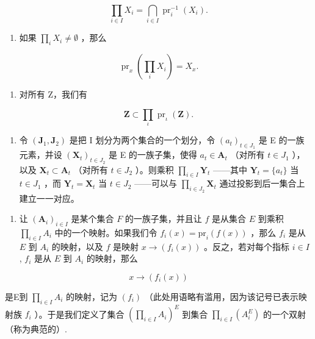 \[
\prod_ {i \in I} X _ {i} = \bigcap_ {i \in I} \operatorname{pr}_{i}^{-1}(X _ {i}).\tag{47}
\]

\begin{enumerate}
\def\labelenumi{(\alph{enumi})}
\setcounter{enumi}{2}
\tightlist
\item
  如果 \(\prod_{i} X_i \neq \emptyset\) ，那么
\end{enumerate}

\[
\operatorname{pr} _ {x} \left(\prod_ {i} X _ {i}\right) = X _ {x}.\tag{48}
\]

\begin{enumerate}
\def\labelenumi{(\alph{enumi})}
\setcounter{enumi}{3}
\tightlist
\item
  对所有 Z，我们有
\end{enumerate}

\[
\mathbf {Z} \subset \prod_ {\iota} \operatorname{pr} _ {\iota} (\mathbf {Z}).\tag{49}
\]

\begin{enumerate}
\def\labelenumi{(\alph{enumi})}
\setcounter{enumi}{4}
\tightlist
\item
  令 \((\mathbf{J}_1, \mathbf{J}_2)\) 是把 I 划分为两个集合的一个划分，令 \((a_t)_{t \in J_1}\) 是 E 的一族元素，并设 \((\mathbf{X}_t)_{t \in J_2}\) 是 E 的一族子集，使得 \(a_t \in \mathbf{A}_t\) （对所有 \(t \in J_1\) ），以及 \(\mathbf{X}_t \subset \mathbf{A}_t\) （对所有 \(t \in J_2\) ）。则乘积 \(\prod_{i \in I} \mathbf{Y}_t\) ——其中 \(\mathbf{Y}_t = \{a_t\}\) 当 \(t \in J_1\) ，而 \(\mathbf{Y}_t = \mathbf{X}_t\) 当 \(t \in J_2\) ——可以与 \(\prod_{i \in J_2} \mathbf{X}_t\) 通过投影到后一集合上建立一一对应。
\end{enumerate}

\begin{enumerate}
\def\labelenumi{\arabic{enumi}.}
\setcounter{enumi}{12}
\tightlist
\item
  让 \((\mathbf{A}_i)_{i\in I}\) 是某个集合 \(F\) 的一族子集，并且让 \(f\) 是从集合 \(E\) 到乘积 \(\prod_{i\in I} A_i\) 中的一个映射。如果我们令 \(f_i(x) = \text{pr}_i(f(x))\) ，那么 \(f_i\) 是从 \(E\) 到 \(A_i\) 的映射，以及 \(f\) 是映射 \(x \to (f_i(x))\) 。反之，若对每个指标 \(i \in I\) , \(f_i\) 是从 \(E\) 到 \(A_i\) 的映射，那么
\end{enumerate}

\[
x \rightarrow (f _ {i} (x))
\]

是E到 \(\prod_{i\in I}A_i\) 的映射，记为 \((f_i)\) （此处用语略有滥用，因为该记号已表示映射族 \(f_i\) ）。于是我们定义了集合 \(\left(\prod_{i\in I}A_i\right)^E\) 到集合 \(\prod_{i\in I}(A_i^E)\) 的一个双射（称为典范的）.

